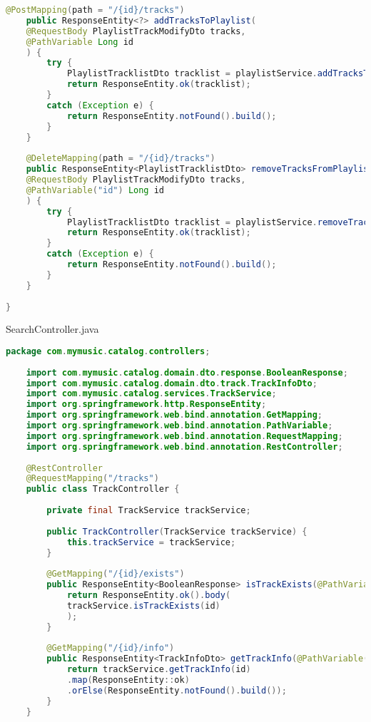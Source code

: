 \begin{lstlisting}[language=java]
	@PostMapping(path = "/{id}/tracks")
	public ResponseEntity<?> addTracksToPlaylist(
	@RequestBody PlaylistTrackModifyDto tracks,
	@PathVariable Long id
	) {
		try {
			PlaylistTracklistDto tracklist = playlistService.addTracksToPlaylist(id, tracks.getTrackIds());
			return ResponseEntity.ok(tracklist);
		}
		catch (Exception e) {
			return ResponseEntity.notFound().build();
		}
	}
	
	@DeleteMapping(path = "/{id}/tracks")
	public ResponseEntity<PlaylistTracklistDto> removeTracksFromPlaylist(
	@RequestBody PlaylistTrackModifyDto tracks,
	@PathVariable("id") Long id
	) {
		try {
			PlaylistTracklistDto tracklist = playlistService.removeTracksFromPlaylist(id, tracks.getTrackIds());
			return ResponseEntity.ok(tracklist);
		}
		catch (Exception e) {
			return ResponseEntity.notFound().build();
		}
	}
	
}

\end{lstlisting}

SearchController.java
\begin{lstlisting}[language=java]
	package com.mymusic.catalog.controllers;
	
	import com.mymusic.catalog.domain.dto.response.BooleanResponse;
	import com.mymusic.catalog.domain.dto.track.TrackInfoDto;
	import com.mymusic.catalog.services.TrackService;
	import org.springframework.http.ResponseEntity;
	import org.springframework.web.bind.annotation.GetMapping;
	import org.springframework.web.bind.annotation.PathVariable;
	import org.springframework.web.bind.annotation.RequestMapping;
	import org.springframework.web.bind.annotation.RestController;
	
	@RestController
	@RequestMapping("/tracks")
	public class TrackController {
		
		private final TrackService trackService;
		
		public TrackController(TrackService trackService) {
			this.trackService = trackService;
		}
		
		@GetMapping("/{id}/exists")
		public ResponseEntity<BooleanResponse> isTrackExists(@PathVariable Long id) {
			return ResponseEntity.ok().body(
			trackService.isTrackExists(id)
			);
		}
		
		@GetMapping("/{id}/info")
		public ResponseEntity<TrackInfoDto> getTrackInfo(@PathVariable("id") Long id) {
			return trackService.getTrackInfo(id)
			.map(ResponseEntity::ok)
			.orElse(ResponseEntity.notFound().build());
		}
	}
\end{lstlisting}

